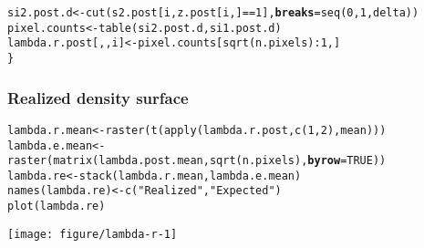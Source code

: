 \documentclass[color=usenames,dvipsnames]{beamer}\usepackage[]{graphicx}\usepackage[]{color}
\makeatletter
\def\maxwidth{ %
  \ifdim\Gin@nat@width>\linewidth
    \linewidth
  \else
    \Gin@nat@width
  \fi
}
\newcommand{\hlnum}[1]{\textcolor[rgb]{0.69,0.494,0}{#1}}%
\newcommand{\hlstr}[1]{\textcolor[rgb]{0.749,0.012,0.012}{#1}}%
\newcommand{\hlopt}[1]{\textcolor[rgb]{0,0,0}{#1}}%
\newcommand{\hlstd}[1]{\textcolor[rgb]{0,0,0}{#1}}%
\newcommand{\hlkwb}[1]{\textcolor[rgb]{0,0.341,0.682}{#1}}%
\newcommand{\hlkwc}[1]{\textcolor[rgb]{0,0,0}{\textbf{#1}}}%
\newcommand{\hlkwd}[1]{\textcolor[rgb]{0.004,0.004,0.506}{#1}}%
\newenvironment{kframe}{%
 \def\at@end@of@kframe{}%
 \ifinner\ifhmode%
  \def\at@end@of@kframe{\end{minipage}}%
  \begin{minipage}{\columnwidth}%
 \fi\fi%
 \def\FrameCommand##1{\hskip\@totalleftmargin \hskip-\fboxsep
 \colorbox{shadecolor}{##1}\hskip-\fboxsep
     \hskip-\linewidth \hskip-\@totalleftmargin \hskip\columnwidth}%
 \MakeFramed {\advance\hsize-\width
   \@totalleftmargin\z@ \linewidth\hsize
   \@setminipage}}%
 {\par\unskip\endMakeFramed%
 \at@end@of@kframe}
\newenvironment{knitrout}{}{} %
\makeatother
\begin{document}
\begin{frame}[fragile]
\begin{knitrout}
\begin{kframe}
\begin{alltt}
    \hlstd{si2.post.d} \hlkwb{<-} \hlkwd{cut}\hlstd{(s2.post[i,z.post[i,]}\hlopt{==}\hlnum{1}\hlstd{],} \hlkwc{breaks}\hlstd{=}\hlkwd{seq}\hlstd{(}\hlnum{0}\hlstd{,} \hlnum{1}\hlstd{, delta))}
    \hlstd{pixel.counts} \hlkwb{<-} \hlkwd{table}\hlstd{(si2.post.d, si1.post.d)}
    \hlstd{lambda.r.post[,,i]} \hlkwb{<-} \hlstd{pixel.counts[}\hlkwd{sqrt}\hlstd{(n.pixels)}\hlopt{:}\hlnum{1}\hlstd{,]}
\hlstd{\}}
\end{alltt}
\end{kframe}
\end{knitrout}
\end{frame}



\begin{frame}[fragile]
  \frametitle{Realized density surface}
\begin{knitrout}\scriptsize
{}\color{fgcolor}\begin{kframe}
\begin{alltt}
\hlstd{lambda.r.mean} \hlkwb{<-} \hlkwd{raster}\hlstd{(}\hlkwd{t}\hlstd{(}\hlkwd{apply}\hlstd{(lambda.r.post,} \hlkwd{c}\hlstd{(}\hlnum{1}\hlstd{,}\hlnum{2}\hlstd{), mean)))}
\hlstd{lambda.e.mean} \hlkwb{<-} \hlkwd{raster}\hlstd{(}\hlkwd{matrix}\hlstd{(lambda.post.mean,} \hlkwd{sqrt}\hlstd{(n.pixels),} \hlkwc{byrow}\hlstd{=}\hlnum{TRUE}\hlstd{))}
\hlstd{lambda.re} \hlkwb{<-} \hlkwd{stack}\hlstd{(lambda.r.mean, lambda.e.mean)}
\hlkwd{names}\hlstd{(lambda.re)} \hlkwb{<-} \hlkwd{c}\hlstd{(}\hlstr{"Realized"}\hlstd{,} \hlstr{"Expected"}\hlstd{)}
\hlkwd{plot}\hlstd{(lambda.re)}
\end{alltt}
\end{kframe}
\texttt{[image: figure/lambda-r-1]} 
\end{knitrout}
\end{frame}
\end{document}
